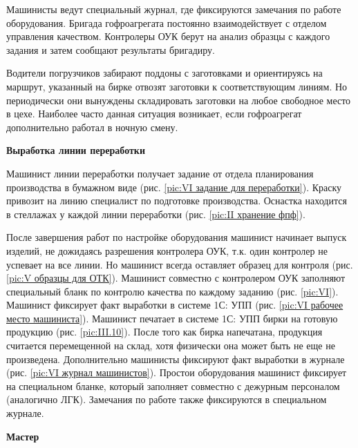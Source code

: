 Машинисты ведут специальный журнал, где фиксируются замечания по работе оборудования.
Бригада гофроагрегата постоянно взаимодействует с отделом управления качеством. Контролеры ОУК берут на анализ образцы с каждого задания и затем сообщают результаты бригадиру. 

Водители погрузчиков забирают поддоны с заготовками и ориентируясь на маршрут, указанный на бирке отвозят заготовки к соответствующим линиям. Но периодически они вынуждены складировать заготовки на любое свободное место в цехе. Наиболее часто данная ситуация возникает, если гофроагрегат дополнительно работал в ночную смену.    




\textbf{Выработка линии переработки}

Машинист линии переработки получает задание от отдела планирования производства в бумажном виде (рис. \ref{pic:VI задание для переработки}). 
Краску привозит на линию специалист по подготовке производства.
Оснастка находится в стеллажах у каждой линии переработки (рис. \ref{pic:II хранение фпф}).

После завершения работ по настройке оборудования машинист начинает выпуск изделий, не дожидаясь разрешения контролера ОУК, т.к. один контролер не успевает на все линии. Но машинист всегда оставляет образец для контроля (рис. \ref{pic:V образцы для ОТК}). Машинист совместно с контролером ОУК заполняют специальный бланк по контролю качества по каждому заданию (рис. \ref{pic:VI}).   
Машинист фиксирует факт выработки в системе 1С: УПП (рис. \ref{pic:VI рабочее место машиниста}). Машинист печатает в системе 1С: УПП  бирки на готовую продукцию (рис. \ref{pic:III.10}). После того как бирка напечатана, продукция считается перемещенной на склад, хотя физически она может быть не еще не произведена. 
Дополнительно машинисты фиксируют факт выработки в журнале (рис. \ref{pic:VI журнал машинистов}).
Простои оборудования машинист фиксирует на специальном бланке, который заполняет совместно с дежурным персоналом (аналогично ЛГК).
Замечания по работе также фиксируются в специальном журнале.

\textbf{Мастер}

